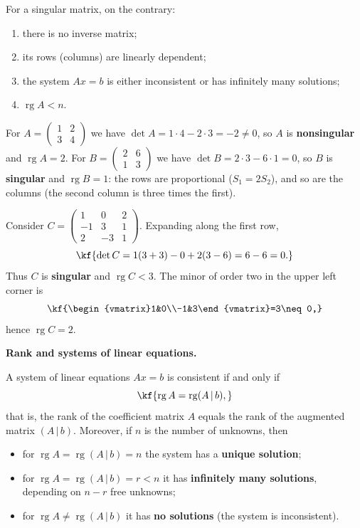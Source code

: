 For a singular matrix, on the contrary:
\begin{enumerate}[label=\arabic*)]
\item there is no inverse matrix;
\item its rows (columns) are linearly dependent;
\item the system $Ax=b$ is either inconsistent or has infinitely many solutions;
\item $\operatorname{rg}A < n$.
\end{enumerate}
\vspace{3pt}
\begin{misol}
For $A=\begin{pmatrix}1&2\\3&4\end{pmatrix}$ we have
$\det A = 1\cdot 4 - 2\cdot 3 = -2 \neq 0$, so $A$ is \textbf{nonsingular}
and $\operatorname{rg}A = 2$.
For $B=\begin{pmatrix}2&6\\1&3\end{pmatrix}$ we have
$\det B = 2\cdot 3 - 6\cdot 1 = 0$, so $B$ is \textbf{singular} and
$\operatorname{rg}B = 1$: the rows are proportional ($S_1=2S_2$), and so are
the columns (the second column is three times the first).
\end{misol}
\begin{misol}
Consider $C=\begin{pmatrix}1&0&2\\-1&3&1\\2&-3&1\end{pmatrix}$. Expanding
along the first row,
\[\kf{\det C = 1(3+3) - 0 + 2(3-6) = 6-6 = 0.}\]
Thus $C$ is \textbf{singular} and $\operatorname{rg}C < 3$. The minor of
order two in the upper left corner is
\[\kf{\begin{vmatrix}1&0\\-1&3\end{vmatrix}=3\neq 0,}\]
hence $\operatorname{rg}C = 2$.
\end{misol}
\textbf{Rank and systems of linear equations.}
\vspace{3pt}
\begin{teorema}
A system of linear equations $Ax=b$ is consistent if and only if
\[\kf{\operatorname{rg}A = \operatorname{rg}(A\,|\,b),}\]
that is, the rank of the coefficient matrix $A$ equals the rank of the
augmented matrix $(A\,|\,b)$. Moreover, if $n$ is the number of unknowns,
then
\begin{itemize}[leftmargin=1.3em]
\item for $\operatorname{rg}A = \operatorname{rg}(A\,|\,b) = n$ the system has
a \textbf{unique solution};
\item for $\operatorname{rg}A = \operatorname{rg}(A\,|\,b) = r < n$ it has
\textbf{infinitely many solutions}, depending on $n-r$ free unknowns;
\item for $\operatorname{rg}A \neq \operatorname{rg}(A\,|\,b)$ it has
\textbf{no solutions} (the system is inconsistent).
\end{itemize}
\end{teorema}

